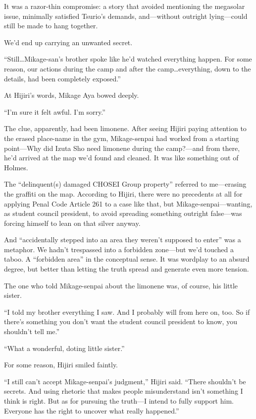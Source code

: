 \documentclass[
    a4paper,
    12pt,
    twoside,
    openany,
    UTF8,
    fontset=windows
]{ctexbook}
\begin{document}
It was a razor-thin compromise: a story that avoided mentioning the megasolar issue, minimally satisfied Tsurio's demands, and---without outright lying---could still be made to hang together.

We'd end up carrying an unwanted secret.

``Still\dots Mikage-san's brother spoke like he'd watched everything happen. For some reason, our actions during the camp and after the camp\dots everything, down to the details, had been completely exposed.''

At Hijiri's words, Mikage Aya bowed deeply.

``I'm sure it felt awful. I'm sorry.''

The clue, apparently, had been limonene. After seeing Hijiri paying attention to the erased place-name in the gym, Mikage-senpai had worked from a starting point---Why did Izuta Sho need limonene during the camp?---and from there, he'd arrived at the map we'd found and cleaned. It was like something out of Holmes.


The ``delinquent(s) damaged CHOSEI Group property'' referred to me---erasing the graffiti on the map. According to Hijiri, there were no precedents at all for applying Penal Code Article 261 to a case like that, but Mikage-senpai---wanting, as student council president, to avoid spreading something outright false---was forcing himself to lean on that silver anyway.

And ``accidentally stepped into an area they weren't supposed to enter'' was a metaphor. We hadn't trespassed into a forbidden zone---but we'd touched a taboo. A ``forbidden area'' in the conceptual sense. It was wordplay to an absurd degree, but better than letting the truth spread and generate even more tension.

The one who told Mikage-senpai about the limonene was, of course, his little sister.

``I told my brother everything I saw. And I probably will from here on, too. So if there's something you don't want the student council president to know, you shouldn't tell me.''

``What a wonderful, doting little sister.''

For some reason, Hijiri smiled faintly.

``I still can't accept Mikage-senpai's judgment,'' Hijiri said. ``There shouldn't be secrets. And using rhetoric that makes people misunderstand isn't something I think is right. But as for pursuing the truth---I intend to fully support him. Everyone has the right to uncover what really happened.''
\end{document}

